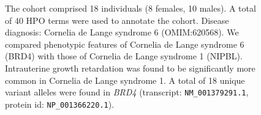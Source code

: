 \begin{figure}[htbp]
\vspace{2em}

\caption{The cohort comprised 18 individuals (8 females, 10 males). A total of 40 HPO terms were used to annotate the cohort. Disease diagnosis: Cornelia de Lange syndrome 6 (OMIM:620568). 
We compared phenotypic features of Cornelia de Lange syndrome 6 (BRD4) with those of Cornelia de Lange syndrome 1 (NIPBL).
Intrauterine growth retardation  was found to be significantly more common in Cornelia de Lange syndrome 1.
A total of 18 unique variant alleles were found in \textit{BRD4} (transcript: \texttt{NM\_001379291.1}, protein id: \texttt{NP\_001366220.1}).}
\end{figure}
